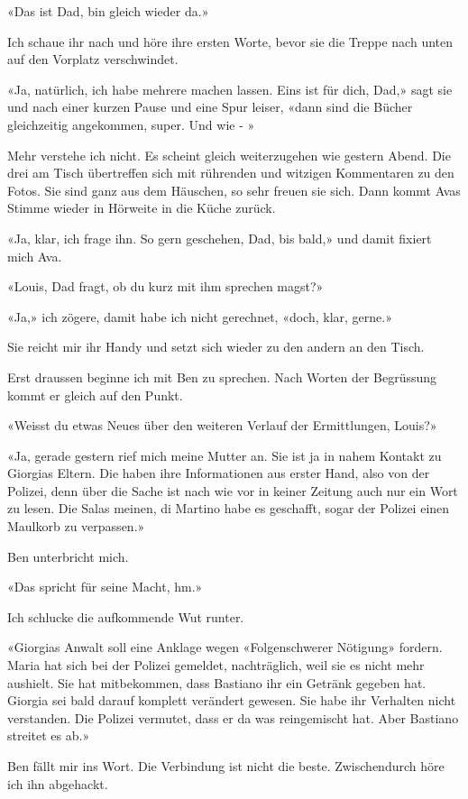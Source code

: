 «Das ist Dad, bin gleich wieder da.»

Ich schaue ihr nach und höre ihre ersten Worte, bevor sie die Treppe
nach unten auf den Vorplatz verschwindet.

«Ja, natürlich, ich habe mehrere machen lassen. Eins ist für dich,
Dad,» sagt sie und nach einer kurzen Pause und eine Spur leiser, «dann
sind die Bücher gleichzeitig angekommen, super. Und wie - »

Mehr verstehe ich nicht. Es scheint gleich weiterzugehen wie gestern Abend.
Die drei am Tisch übertreffen sich mit rührenden und witzigen Kommentaren zu den
Fotos. Sie sind ganz aus dem Häuschen, so sehr freuen sie sich.
Dann kommt Avas Stimme wieder in Hörweite in die Küche zurück.

«Ja, klar, ich frage ihn. So gern geschehen, Dad, bis bald,» und damit
fixiert mich Ava.

«Louis, Dad fragt, ob du kurz mit ihm sprechen magst?»

«Ja,» ich zögere, damit habe ich nicht gerechnet, «doch, klar, gerne.»

Sie reicht mir ihr Handy und setzt sich wieder zu den andern an den
Tisch.

Erst draussen beginne ich mit Ben zu sprechen.
Nach Worten der Begrüssung kommt er gleich auf den Punkt.

«Weisst du etwas Neues über den weiteren Verlauf der Ermittlungen,
Louis?»

«Ja, gerade gestern rief mich meine Mutter an. Sie ist ja in nahem
Kontakt zu Giorgias Eltern. Die haben ihre Informationen aus erster
Hand, also von der Polizei, denn über die Sache ist nach wie vor in
keiner Zeitung auch nur ein Wort zu lesen. Die Salas meinen, di Martino
habe es geschafft, sogar der Polizei einen Maulkorb zu verpassen.»

Ben unterbricht mich.

«Das spricht für seine Macht, hm.»

Ich schlucke die aufkommende Wut runter.

«Giorgias Anwalt soll eine Anklage wegen «Folgenschwerer Nötigung»
fordern. Maria hat sich bei der Polizei gemeldet, nachträglich, weil sie
es nicht mehr aushielt. Sie hat mitbekommen, dass Bastiano ihr ein
Getränk gegeben hat. Giorgia sei bald darauf komplett verändert gewesen.
Sie habe ihr Verhalten nicht verstanden. Die Polizei vermutet, dass er
da was reingemischt hat. Aber Bastiano streitet es ab.»

Ben fällt mir ins Wort. Die Verbindung ist nicht die beste.
Zwischendurch höre ich ihn abgehackt.

